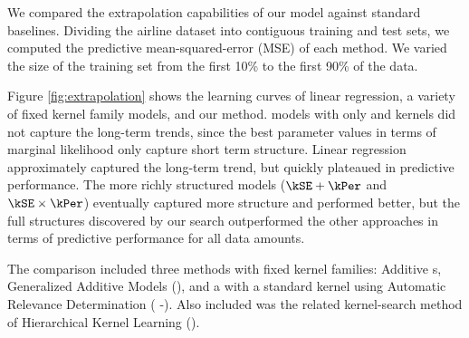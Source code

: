 We compared the extrapolation capabilities of our model against standard baselines\footnotemark.
Dividing the airline dataset into contiguous training and test sets, we computed the predictive mean-squared-error (MSE) of each method.
We varied the size of the training set from the first 10\% to the first 90\% of the data.

Figure \ref{fig:extrapolation} shows the learning curves of linear regression, a variety of fixed kernel family \gp{} models, and our method.  
\gp{} models with only \kSE{} and \kPer{} kernels did not capture the long-term trends, since the best parameter values in terms of \gp{} marginal likelihood only capture short term structure. 
Linear regression approximately captured the long-term trend, but quickly plateaued in predictive performance.
The more richly structured \gp{} models (${\kSE + \kPer}$ and ${\kSE \times \kPer}$) eventually captured more structure and performed better, but the full structures discovered by our search outperformed the other approaches in terms of predictive performance for all data amounts.

\footnotetext{
In one dimension, the predictive means of all baseline methods in table \ref{tbl:Regression Mean Squared Error} are identical to that of a \gp{} with an $\kSE{}$ kernel.}



The comparison included three methods with fixed kernel families: Additive \gp{}s, Generalized Additive Models (\GAM{}), and a \gp{} with a standard \kSE{} kernel using Automatic Relevance Determination (\gp{} \kSE{}-\ARD{}).  Also included was the related kernel-search method of Hierarchical Kernel Learning (\HKL{}).

